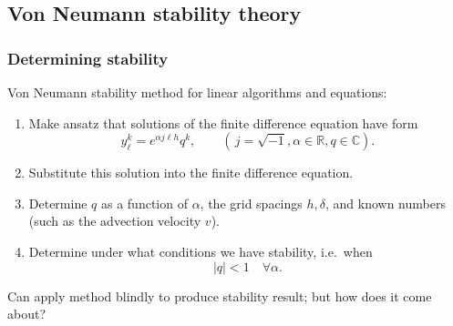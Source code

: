 \documentclass{beamer}
\begin{document}
\subsection{Von Neumann stability theory}

\begin{frame}
  \frametitle{Determining stability}

  Von Neumann stability method for linear algorithms and equations:
  \begin{enumerate}
  \item<2-> Make ansatz that solutions of the finite difference
    equation have form
    \begin{equation*}
      y_{\ell}^k =  e^{\alpha j \ell h} q^k, \qquad (\, j = \sqrt{-1}, \alpha \in {\mathbb R}, q \in {\mathbb C} ).
    \end{equation*}
  \item<3-> Substitute this solution into the finite difference
    equation.
  \item<4-> Determine $q$ as a function of $\alpha$, the grid spacings
    $h,\delta$, and known numbers (such as the advection velocity
    $v$).
  \item<5-> Determine under what conditions we have stability, i.e.\ when
    \begin{equation*}
      |q| < 1 \quad \forall \alpha.
    \end{equation*}
  \end{enumerate} \pause[6]
  Can apply method blindly to produce stability result; but how does
  it come about?

\end{frame}
\end{document}
